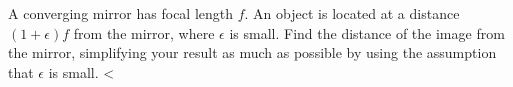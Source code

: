A converging mirror has focal length $f$. An object is located at
a distance $(1+\epsilon)f$ from the mirror, where $\epsilon$ is
small. Find the distance of the image from the mirror, simplifying
your result as much as possible by using the assumption that $\epsilon$
is small.
<%
